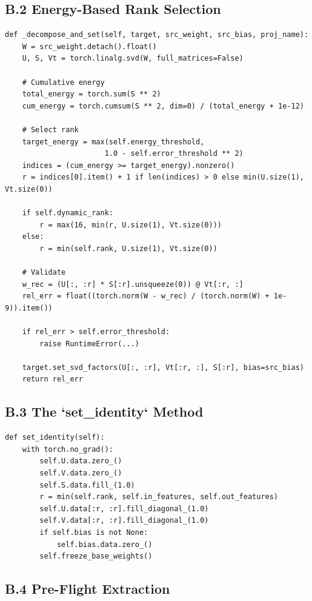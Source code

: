 \subsection{B.2 Energy-Based Rank Selection}

\begin{lstlisting}
def _decompose_and_set(self, target, src_weight, src_bias, proj_name):
    W = src_weight.detach().float()
    U, S, Vt = torch.linalg.svd(W, full_matrices=False)
    
    # Cumulative energy
    total_energy = torch.sum(S ** 2)
    cum_energy = torch.cumsum(S ** 2, dim=0) / (total_energy + 1e-12)
    
    # Select rank
    target_energy = max(self.energy_threshold, 
                       1.0 - self.error_threshold ** 2)
    indices = (cum_energy >= target_energy).nonzero()
    r = indices[0].item() + 1 if len(indices) > 0 else min(U.size(1), Vt.size(0))
    
    if self.dynamic_rank:
        r = max(16, min(r, U.size(1), Vt.size(0)))
    else:
        r = min(self.rank, U.size(1), Vt.size(0))
    
    # Validate
    w_rec = (U[:, :r] * S[:r].unsqueeze(0)) @ Vt[:r, :]
    rel_err = float((torch.norm(W - w_rec) / (torch.norm(W) + 1e-9)).item())
    
    if rel_err > self.error_threshold:
        raise RuntimeError(...)
    
    target.set_svd_factors(U[:, :r], Vt[:r, :], S[:r], bias=src_bias)
    return rel_err
\end{lstlisting}

\subsection{B.3 The `set\_identity` Method}

\begin{lstlisting}
def set_identity(self):
    with torch.no_grad():
        self.U.data.zero_()
        self.V.data.zero_()
        self.S.data.fill_(1.0)
        r = min(self.rank, self.in_features, self.out_features)
        self.U.data[:r, :r].fill_diagonal_(1.0)
        self.V.data[:r, :r].fill_diagonal_(1.0)
        if self.bias is not None:
            self.bias.data.zero_()
        self.freeze_base_weights()
\end{lstlisting}

\subsection{B.4 Pre-Flight Extraction}

